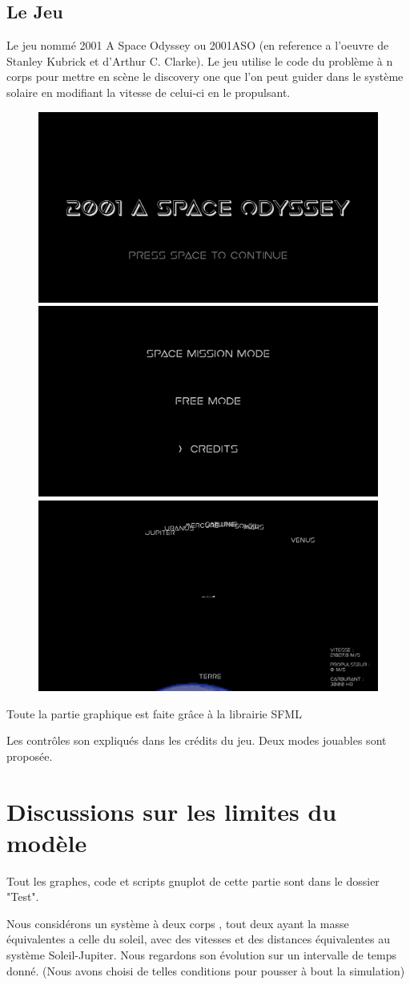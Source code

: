 \documentclass[a4paper]{article}
\begin{document}
\subsection{Le Jeu}
Le jeu nommé 2001 A Space Odyssey ou 2001ASO (en reference a l'oeuvre de Stanley Kubrick et d'Arthur C. Clarke).
Le jeu utilise le code du problème à n corps pour mettre en scène le discovery one que l'on peut guider dans le système solaire en modifiant la vitesse de celui-ci en le propulsant.
\begin{figure}[h]
\centering
\includegraphics[width=.3\textwidth]{ecrandemarage.png}
 
\includegraphics[width=.3\textwidth]{Choix.png}
 
\includegraphics[width=.3\textwidth]{Jeux.png}
 
\end{figure}
Toute la partie graphique est faite grâce à la librairie SFML

Les contrôles son expliqués dans les crédits du jeu.
Deux modes jouables sont proposée.
\newpage

\section{Discussions sur les limites du modèle}
\label{sec:Discussion sur les limites du modèle}

Tout les graphes, code et scripts gnuplot de cette partie sont dans le dossier "Test".
\newline

Nous considérons un système à deux corps , tout deux ayant la masse équivalentes a celle du soleil, avec des vitesses et des distances équivalentes au système Soleil-Jupiter. Nous regardons son évolution  sur un intervalle de temps donné. (Nous avons choisi de telles conditions pour pousser à bout la simulation)
\end{document}
